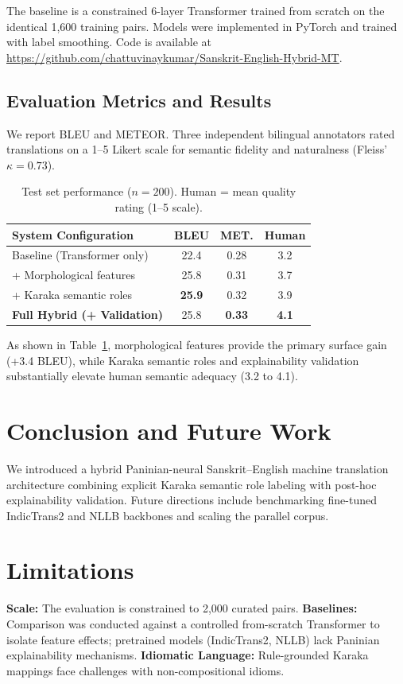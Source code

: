 \documentclass[11pt]{article}
\begin{document}
The baseline is a constrained 6-layer Transformer trained from scratch on the identical 1,600 training pairs. Models were implemented in PyTorch and trained with label smoothing. Code is available at \url{https://github.com/chattuvinaykumar/Sanskrit-English-Hybrid-MT}.

\subsection{Evaluation Metrics and Results}
We report BLEU \cite{papineni2002bleu} and METEOR. Three independent bilingual annotators rated translations on a 1--5 Likert scale for semantic fidelity and naturalness (Fleiss' $\kappa = 0.73$).

\begin{table}[h]
\centering
\small
\begin{tabular}{lccc}
\toprule
\textbf{System Configuration} & \textbf{BLEU} & \textbf{MET.} & \textbf{Human} \\
\midrule
Baseline (Transformer only) & 22.4 & 0.28 & 3.2 \\
+ Morphological features & 25.8 & 0.31 & 3.7 \\
+ Karaka semantic roles & \textbf{25.9} & 0.32 & 3.9 \\
\textbf{Full Hybrid (+ Validation)} & 25.8 & \textbf{0.33} & \textbf{4.1} \\
\bottomrule
\end{tabular}
\caption{Test set performance ($n = 200$). Human = mean quality rating (1--5 scale).}
\label{tab:results}
\end{table}

As shown in Table~\ref{tab:results}, morphological features provide the primary surface gain (+3.4 BLEU), while Karaka semantic roles and explainability validation substantially elevate human semantic adequacy (3.2 to 4.1).

\section{Conclusion and Future Work}
We introduced a hybrid Paninian-neural Sanskrit--English machine translation architecture combining explicit Karaka semantic role labeling with post-hoc explainability validation. Future directions include benchmarking fine-tuned IndicTrans2 \cite{gala2023indictrans2} and NLLB \cite{nllb2022} backbones and scaling the parallel corpus.

\section*{Limitations}
\textbf{Scale:} The evaluation is constrained to 2,000 curated pairs. \textbf{Baselines:} Comparison was conducted against a controlled from-scratch Transformer to isolate feature effects; pretrained models (IndicTrans2, NLLB) lack Paninian explainability mechanisms. \textbf{Idiomatic Language:} Rule-grounded Karaka mappings face challenges with non-compositional idioms.



\end{document}
